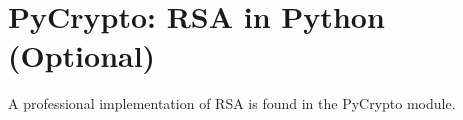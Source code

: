 \section*{PyCrypto: RSA in Python (Optional)}
A professional implementation of RSA is found in the PyCrypto module.

\begin{comment}
RSA encryption in Python can be accomplished very easily with a library called PyCrypto.
This library contains many secure hash functions, random number generators, and encryption classes.
Many programs use PyCrypto for their security needs.
\begin{warn}
Make certain that you are using the latest version of PyCrypto.
Security software is updated often to fix security vulnerablilities and bugs.
The current version of PyCrypto at the time of writing is version 2.6.1.
\end{warn}

The RSA module in PyCrypto is located in the PublicKey module.
Let's try a small example using PyCrypto.
The library allows us to explicity construct a key, or generate a key automatically.
\begin{lstlisting}
>>> from Crypto.PublicKey import RSA
>>> from Crypto import Random
>>> keypair = RSA.generate(2048) #generate a 2048-bit RSA key
>>> publickey = keypair.publickey()
>>> share_this = publickey.exportkey()
\end{lstlisting}

The RSA encryption and decryption methods on these keys are textbook approaches.
However, to increase security, we will want to pad the messages so every message encrypted with a particular will become exactly as large (in bits) as the key itself.
A commonly used padding algorithm is implemented in PyCrypto in the \li{Crypto.Cipher.PKCS1_OAEP} module.
\begin{lstlisting}
>>> from Crypto.Cipher import PKCS1_OAEP as oaep

# generate a new key from the original RSA key.
# This key can encrypt and decrypt
>>> paddedkey = oaep.new(keypair)
>>> encrypted = paddedkey.encrypt('hello world')
>>> paddedkey.decrypt(encrypted)
'hello world'
\end{lstlisting}

To sign the message we use PyCrypto's \li{Crypto.Signature.PKCS1_PSS} module.
We first need to hash the message using a cryptographically secure hash, such as SHA.
Just as only private keys can decrypt, only private keys can sign.
Public keys can decrypt and verify.
\begin{lstlisting}
>>> from Crypto.Signautre import PKCS1_PSS as pss
>>> from Crypto.Hash import SHA
>>> sigkey = pss.new(keypair)
>>> mhash = SHA.new("Hello World")
>>> sigkey.sign
\end{lstlisting}



\end{comment}
